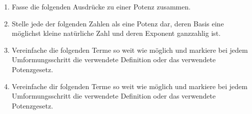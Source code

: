\documentclass[11pt,oneside]{article}
\begin{document}
	\begin{aufgabe}
		\begin{enumerate}
			\item Fasse die folgenden Ausdrücke zu einer Potenz zusammen.
			\item Stelle jede der folgenden Zahlen als eine Potenz dar, deren Basis eine möglichst kleine natürliche Zahl und deren Exponent ganzzahlig ist.
			\item Vereinfache die folgenden Terme so weit wie möglich und markiere bei jedem Umformungsschritt die verwendete Definition oder das verwendete Potenzgesetz.
			\item Vereinfache dir folgenden Terme so weit wie möglich und markiere bei jedem Umformungsschritt die verwendete Definition oder das verwendete Potenzgesetz.
		\end{enumerate}
	\end{aufgabe}
\end{document}
